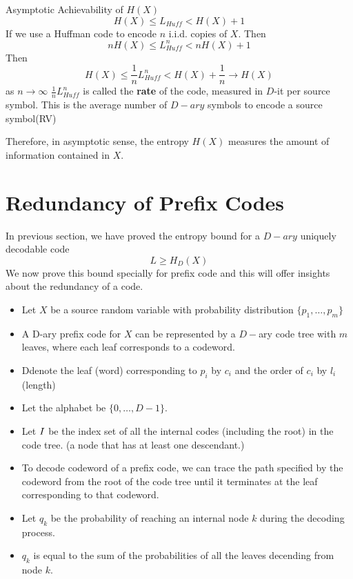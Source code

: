 \documentclass[../main.tex]{subfiles}
\begin{document}
\begin{bbox}{Asymptotic Achievability of $H(X)$}
\[
    H(X)\leq L_{Huff} < H(X)+1
\]
If we use a Huffman code to encode $n$ i.i.d. copies of $X$. Then \[
    nH(X)\leq L^{n}_{Huff} < nH(X)+1
\] 
Then \[
H(X)\leq \frac{1}{n}L^{n}_{Huff} < H(X)+\frac{1}{n}\to H(X)
\] as $n\to \infty$
$\frac{1}{n}L^{n}_{Huff}$ is called the \textbf{rate} of the code, measured in $D$-it per source symbol.
This is the average number of $D-ary$ symbols to encode a source symbol(RV)
\begin{remark*}
    Therefore, in asymptotic sense, the entropy $H(X)$ measures the amount of information contained in $X$.
\end{remark*}
\end{bbox}

\section*{Redundancy of Prefix Codes}
In previous section, we have proved the entropy bound for a $D-ary$ uniquely decodable code \[
L\geq H_D(X)
\]
We now prove this bound specially for prefix code and this will offer insights about the redundancy of a code.
\begin{itemize}
    \item Let $X$ be a source random variable with probability distribution $\{p_1,\dots,p_m\}$
    \item A D-ary prefix code for $X$ can be represented by a $D-$ary code tree with $m$ leaves, where each leaf corresponds to a codeword.
    \item Ddenote the leaf (word) corresponding to $p_i$ by $c_i$
 and the order of $c_i$ by $l_i$ (length)
 \item Let the alphabet be $\{0,\dots,D-1\}$.
 \item Let $I$ be the index set of all the internal codes (including the root) in the code tree. (a node that has at least one descendant.)
 \end{itemize}
 \begin{itemize}
     \item To decode codeword of a prefix code, we can trace the path specified by the codeword from the root of the code tree until it terminates at the leaf corresponding to that codeword.
     \item Let $q_k$ be the probability of reaching an internal node $k$ during the decoding process.
     \item $q_k$ is equal to the sum of the probabilities of all the leaves decending from node $k$.
 \end{itemize}
\end{document}
